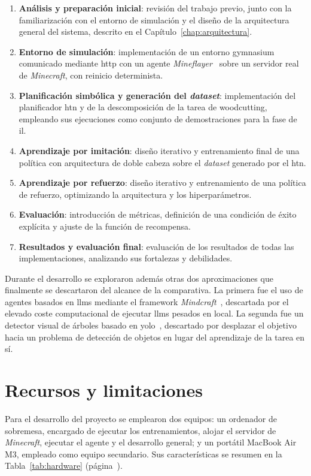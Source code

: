 \begin{enumerate}
  \item \textbf{Análisis y preparación inicial}: revisión del trabajo previo,
        junto con la familiarización con el
        entorno de simulación y el diseño de la arquitectura general del
        sistema, descrito en el Capítulo~\ref{chap:arquitectura}.
  \item \textbf{Entorno de simulación}: implementación de un entorno
        \gls{gymnasium} comunicado mediante \acrshort{http} con un agente \textit{Mineflayer}~\cite{mineflayer}
        sobre un servidor real de \textit{Minecraft}, con reinicio determinista.
  \item \textbf{Planificación simbólica y generación del \textit{dataset}}:
        implementación del planificador \gls{htn} y de la descomposición de la tarea
        de \gls{woodcutting}, empleando sus ejecuciones como conjunto de
        demostraciones para la fase de \gls{il}.
  \item \textbf{Aprendizaje por imitación}: diseño iterativo y entrenamiento final de una \gls{política} con
        arquitectura de doble cabeza sobre el \textit{dataset} generado por el
        \gls{htn}.
  \item \textbf{Aprendizaje por refuerzo}: diseño iterativo y entrenamiento de una \gls{política} de refuerzo,
        optimizando la arquitectura y los hiperparámetros.
  \item \textbf{Evaluación}: introducción de métricas, definición de una condición de éxito explícita y
        ajuste de la función de recompensa.
  \item \textbf{Resultados y evaluación final}: evaluación de los resultados de todas las implementaciones,
        analizando sus fortalezas y debilidades.
\end{enumerate}

Durante el desarrollo se exploraron además otras dos aproximaciones que
finalmente se descartaron del alcance de la comparativa. La primera fue el uso de
agentes basados en \glspl{llm} mediante el \gls{framework}
\textit{Mindcraft}~\cite{mindcraft2025}, descartada por el elevado coste computacional de ejecutar \glspl{llm} pesados en local. 
La segunda fue un detector visual de árboles
basado en \acrshort{yolo}~\cite{DBLP:conf/cvpr/RedmonDGF16}, descartado por desplazar el objetivo 
hacia un problema de detección de objetos en lugar del aprendizaje de la tarea en sí.

\section{Recursos y limitaciones}
Para el desarrollo del proyecto se emplearon dos equipos: un ordenador de
sobremesa, encargado de ejecutar los entrenamientos, alojar el
servidor de \textit{Minecraft}, ejecutar el agente y el desarrollo general; y un portátil MacBook Air M3,
empleado como equipo secundario. Sus características se resumen en la Tabla~\ref{tab:hardware}
(página~\pageref{tab:hardware}).

